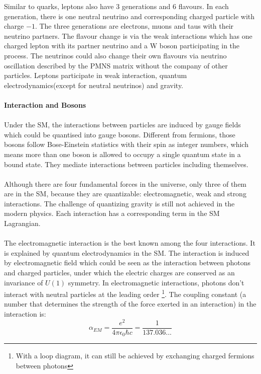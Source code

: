 Similar to quarks, leptons also have 3 generations and 6 flavours. In each generation, there is one neutral neutrino and corresponding charged particle with charge $-1$. The three generations are electrons, muons and taus with their neutrino partners. The flavour change is via the weak interactions which has one charged lepton with its partner neutrino and a W boson participating in the process. The neutrinos could also change their own flavours via neutrino oscillation described by the PMNS matrix without the company of other particles. Leptons participate in weak interaction, quantum electrodynamics(except for neutral neutrinos) and gravity.
\\
\\{\bf Interaction and Bosons}
\\
\\Under the SM, the interactions between particles are induced by gauge fields which could be quantised into gauge bosons. Different from fermions, those bosons follow Bose-Einstein statistics with their spin as integer numbers, which means more than one boson is allowed to occupy a single quantum state in a bound state. They mediate interactions between particles including themselves. 
\\
\\Although there are four fundamental forces in the universe, only three of them are in the SM, because they are quantizable: electromagnetic, weak and strong interactions. The challenge of quantizing gravity is still not achieved in the modern physics. Each interaction has a corresponding term in the SM Lagrangian.
\\
\\The electromagnetic interaction is the best known among the four interactions. It is explained by quantum electrodynamics in the SM. The interaction is induced by electromagnetic field which could be seen as the interaction between photons and charged particles, under which the electric charges are conserved as an invariance of $U(1)$ symmetry. In electromagnetic interactions, photons don't interact with neutral particles at the leading order \footnote{With a loop diagram, it can still be achieved by exchanging charged fermions between photons}. The coupling constant (a number that determines the strength of the force exerted in an interaction) in the interaction is:
\\
\begin{equation}
\alpha_{EM} = \frac{e^2}{4\pi\epsilon_0\hbar c}=\frac{1}{137.036...}
\end{equation}
